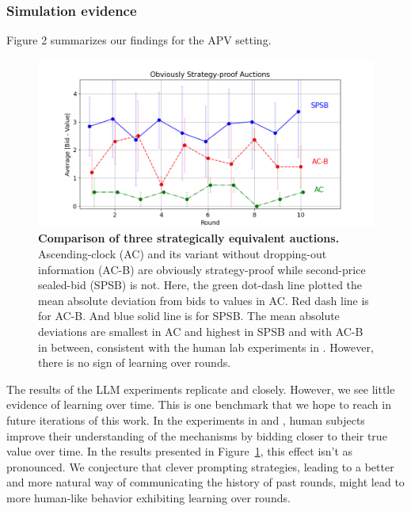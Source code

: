\documentclass{article} %
\begin{document}
\subsubsection{Simulation evidence}
Figure 2 summarizes our findings for the APV setting. 

\begin{figure}[h]  
    \centering  
\includegraphics[width=\linewidth]{Figs/OSP.png}  
    \caption{\textbf{Comparison of three strategically equivalent auctions.} Ascending-clock (AC) and its variant without dropping-out information (AC-B) are obviously strategy-proof while second-price sealed-bid (SPSB) is not. Here, the green dot-dash line plotted the mean absolute deviation from bids to values in AC. Red dash line is for AC-B. And blue solid line is for SPSB. The mean absolute deviations are smallest in AC and highest in SPSB and with AC-B in between, consistent with the human lab experiments in \cite{breitmoser2022obviousness}. However, there is no sign of learning over rounds.}
    
    \label{fig:osp}
\end{figure}

The results of the LLM experiments replicate \cite{li2017obviously} and \citet{breitmoser2022obviousness} closely.
However, we see little evidence of learning over time. This is one benchmark that we hope to reach in future iterations of this work. 
In the experiments in \citet{li2017obviously} and \citet{breitmoser2022obviousness}, human subjects improve their understanding of the mechanisms by bidding closer to their true value over time. 
In the results presented in Figure~\ref{fig:osp}, this effect isn't as pronounced. 
We conjecture that clever prompting strategies, leading to a better and more natural way of communicating the history of past rounds, might lead to more human-like behavior exhibiting learning over rounds.
\end{document}
